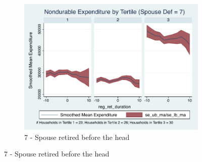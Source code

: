 \documentclass[11pt,onecolumn]{article}
\numberwithin{figure}{section}
\begin{document}
\begin{figure}
\begin{subfigure}{1.0\textwidth}
	\caption{7 - Spouse retired before the head}
	\centering
	\includegraphics[width=0.8\linewidth]{../ConsumptionPostRetirement_by_SpouseDef/Smoothed/spouse_def_7.pdf}
	\end{subfigure}
	\vspace{1cm}
	

\end{figure}
\end{document}
